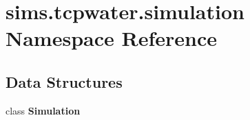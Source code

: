 \section{sims.\+tcpwater.\+simulation Namespace Reference}
\label{namespacesims_1_1tcpwater_1_1simulation}
\subsection*{Data Structures}
\begin{DoxyCompactItemize}
\item 
class {\bf Simulation}
\end{DoxyCompactItemize}
